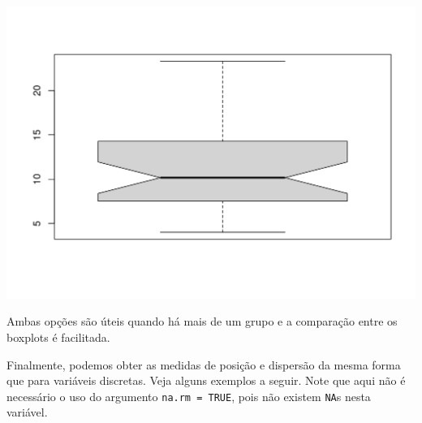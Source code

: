 \documentclass[
  10pt,
  a4paper]{book}
\newenvironment{Shaded}{\begin{snugshade}}{\end{snugshade}}
\newcommand{\AttributeTok}[1]{\textcolor[rgb]{0.77,0.63,0.00}{#1}}
\newcommand{\ConstantTok}[1]{\textcolor[rgb]{0.00,0.00,0.00}{#1}}
\newcommand{\FunctionTok}[1]{\textcolor[rgb]{0.00,0.00,0.00}{#1}}
\newcommand{\NormalTok}[1]{#1}
\newcommand{\SpecialCharTok}[1]{\textcolor[rgb]{0.00,0.00,0.00}{#1}}
\begin{document}
\begin{Shaded}
\end{Shaded}

\begin{center}\includegraphics{figures/unnamed-chunk-313-1} \end{center}

Ambas opções são úteis quando há mais de um grupo e a comparação entre
os boxplots é facilitada.

Finalmente, podemos obter as medidas de posição e dispersão da mesma
forma que para variáveis discretas. Veja alguns exemplos a seguir. Note
que aqui não é necessário o uso do argumento \texttt{na.rm\ =\ TRUE}, pois não
existem \texttt{NA}s nesta variável.
\end{document}

